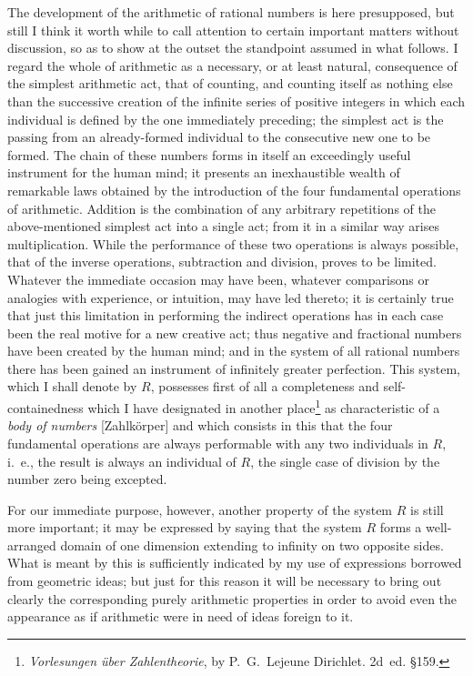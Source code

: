 \documentclass[oneside]{book}
\begin{document}
The development of the arithmetic of rational
numbers is here presupposed, but still I think it
worth while to call attention to certain important
matters without discussion, so as to show at the outset
the standpoint assumed in what follows. I regard
the whole of arithmetic as a necessary, or at least natural,
consequence of the simplest arithmetic act, that
of counting, and counting itself as nothing else than
the successive creation of the infinite series of positive
integers in which each individual is defined by the
one immediately preceding; the simplest act is the
passing from an already-formed individual to the consecutive
new one to be formed. The chain of these
numbers forms in itself an exceedingly useful instrument
for the human mind; it presents an inexhaustible
wealth of remarkable laws obtained by the introduction
of the four fundamental operations of arithmetic.
Addition is the combination of any arbitrary repetitions
of the above-mentioned simplest act into a single
act; from it in a similar way arises multiplication.
While the performance of these two operations is always
possible, that of the inverse operations, subtraction
and division, proves to be limited. Whatever the
immediate occasion may have been, whatever comparisons
or analogies with experience, or intuition,
may have led thereto; it is certainly true that just
this limitation in performing the indirect operations
has in each case been the real motive for a new creative
act; thus negative and fractional numbers have
been created by the human mind; and in the system
of all rational numbers there has been gained an instrument
of infinitely greater perfection. This system,
which I shall denote by $R$, possesses first of all a completeness
and self-containedness which I have designated
in another place\footnote{\textit{Vorlesungen über Zahlentheorie}, by P.~G.~Lejeune Dirichlet. 2d~ed. §159.} as characteristic of a \textit{body of
numbers} [Zahlkörper] and which consists in this that
the four fundamental operations are always performable
with any two individuals in $R$, i.~e., the result is
always an individual of $R$, the single case of division
by the number zero being excepted.

For our immediate purpose, however, another
property of the system $R$ is still more important; it
may be expressed by saying that the system $R$ forms
a well-arranged domain of one dimension extending
to infinity on two opposite sides. What is meant by
this is sufficiently indicated by my use of expressions
borrowed from geometric ideas; but just for this reason
it will be necessary to bring out clearly the corresponding
purely arithmetic properties in order to
avoid even the appearance as if arithmetic were in
need of ideas foreign to it.
\end{document}
